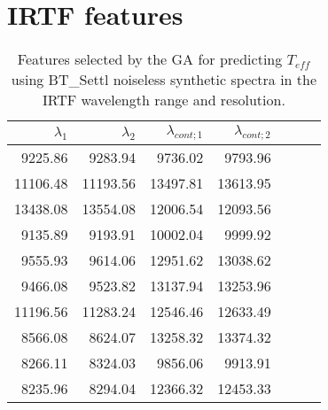 
\begin{appendix}
\label{app:features}
  \section{IRTF features}
\label{app:features:irtf}


%
% 
\begin{table}
\begin{center}
\begin{tabular}{rrrrrrr}
  \hline
  $\lambda_1$ & $\lambda_2$ & $\lambda_{cont;1}$ & $\lambda_{cont;2} $ \\ 
  \hline
9225.86  & 9283.94   & 9736.02  & 9793.96 \\
11106.48 & 11193.56  & 13497.81 & 13613.95 \\
13438.08 & 13554.08  & 12006.54 & 12093.56 \\
9135.89  & 9193.91   & 10002.04 & 9999.92 \\
9555.93  & 9614.06   & 12951.62 & 13038.62 \\
9466.08  & 9523.82   & 13137.94 & 13253.96 \\
11196.56 & 11283.24  & 12546.46 & 12633.49 \\
8566.08  & 8624.07   & 13258.32 & 13374.32 \\
8266.11  & 8324.03   & 9856.06  & 9913.91 \\
8235.96  & 8294.04   & 12366.32 & 12453.33 \\
\hline
\end{tabular}
\caption {Features selected by the GA for predicting $T_{eff}$ using
  BT\_Settl noiseless synthetic spectra in the IRTF wavelength range
  and resolution. } \label{tab:irtf-teff-noiseless}
\end{center}
\end{table}


\end{appendix}
